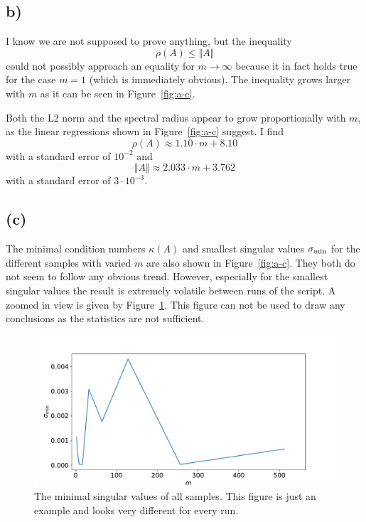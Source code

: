 \documentclass[a4paper, 11pt]{article}
\begin{document}
\FloatBarrier
\subsection*{b)}
I know we are not supposed to prove anything, but the inequality
\begin{equation}
  \rho(A) \leq \Vert A\Vert
\end{equation}
could not possibly approach an equality for $m \rightarrow \infty$ because it in
fact holds true for the case $m=1$ (which is immediately obvious). The
inequality grows larger with $m$ as it can be seen in Figure~\ref{fig:a-c}.

Both the L2 norm and the spectral radius appear to grow proportionally with
$m$, as the linear regressions shown in Figure~\ref{fig:a-c} suggest. I find
\begin{equation}
  \rho(A) \approx 1.10\cdot m + 8.10
\end{equation}
with a standard error of $10^{-2}$ and
\begin{equation}
  \Vert A \Vert \approx 2.033\cdot m + 3.762
\end{equation}
with a standard error of $3\cdot 10^{-3}$.

\FloatBarrier
\subsection*{(c)}
The minimal condition numbers $\kappa(A)$ and smallest singular values
$\sigma_\textup{min}$ for the different samples with varied $m$ are also shown
in Figure~\ref{fig:a-c}. They both do not seem to follow any obvious trend.
However, especially for the smallest singular values the result is extremely
volatile between runs of the script. A zoomed in view is given by
Figure~\ref{fig:sig_min}. This figure can not be used to draw any conclusions
as the statistics are not sufficient. 
\begin{figure}
  \centering
  \includegraphics[width=\textwidth]{../2/sigma_min.pdf}
  \caption{The minimal singular values of all samples. This figure is just an
  example and looks very different for every run.}
  \label{fig:sig_min}
\end{figure}
\end{document}
